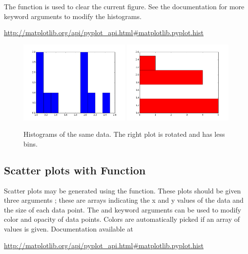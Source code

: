 \documentclass[11pt]{cselabheader}
\begin{document}
The  function is used to clear the current figure.
See the documentation for more keyword arguments to modify the histograms.

\begin{center}
\url{http://matplotlib.org/api/pyplot_api.html#matplotlib.pyplot.hist}
\end{center}

\begin{figure}[H]
  \centering
  \includegraphics[width=0.49\textwidth]{img/matplotlib_hist1.png}
  \includegraphics[width=0.49\textwidth]{img/matplotlib_hist2.png}
  \caption{Histograms of the same data. The right plot is rotated and has less
bins.}
\end{figure}

\subsection{Scatter plots with  Function}
Scatter plots may be generated using the  function.
These plots should be given three arguments ; these are
arrays indicating the x and y values of the data and the size of each data point.
The  and  keyword arguments can be used to
modify color and opacity of data points. Colors are automatically picked if an
array of values is given. Documentation available at

\begin{center}
\url{http://matplotlib.org/api/pyplot_api.html#matplotlib.pyplot.hist}
\end{center}
\end{document}
